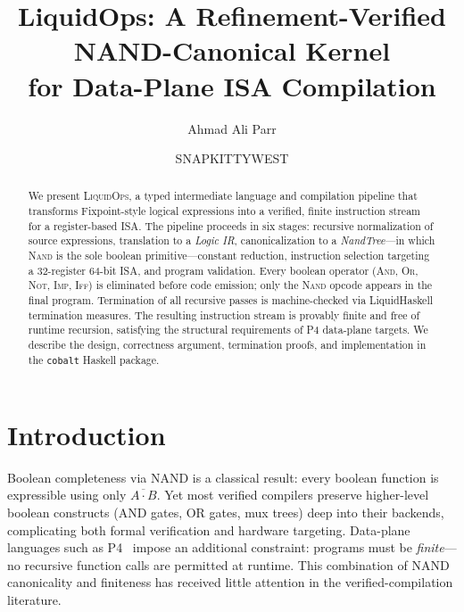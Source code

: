 \documentclass[sigconf,natbib=false]{acmart}
\begin{document}
\title{LiquidOps: A Refinement-Verified NAND-Canonical Kernel\\for Data-Plane ISA Compilation}

\author{Ahmad Ali Parr}

\author{SNAPKITTYWEST}

\begin{abstract}
We present \textsc{LiquidOps}, a typed intermediate language and compilation pipeline
that transforms Fixpoint-style logical expressions into a verified, finite instruction
stream for a register-based ISA. The pipeline proceeds in six stages: recursive
normalization of source expressions, translation to a \emph{Logic IR}, canonicalization
to a \emph{NandTree}---in which \textsc{Nand} is the sole boolean primitive---constant
reduction, instruction selection targeting a 32-register 64-bit ISA, and program
validation. Every boolean operator (\textsc{And}, \textsc{Or}, \textsc{Not},
\textsc{Imp}, \textsc{Iff}) is eliminated before code emission; only the
\textsc{Nand} opcode appears in the final program. Termination of all recursive
passes is machine-checked via LiquidHaskell termination measures. The resulting
instruction stream is provably finite and free of runtime recursion, satisfying
the structural requirements of P4 data-plane targets. We describe the design,
correctness argument, termination proofs, and implementation in the
\texttt{cobalt} Haskell package.
\end{abstract}


\maketitle


\section{Introduction}

Boolean completeness via NAND is a classical result: every boolean function is
expressible using only $\overline{A \cdot B}$. Yet most verified compilers
preserve higher-level boolean constructs (AND gates, OR gates, mux trees) deep
into their backends, complicating both formal verification and hardware targeting.
Data-plane languages such as P4~\cite{bosshart2014p4} impose an additional
constraint: programs must be \emph{finite}---no recursive function calls are
permitted at runtime. This combination of NAND canonicality and finiteness has
received little attention in the verified-compilation literature.
\end{document}
